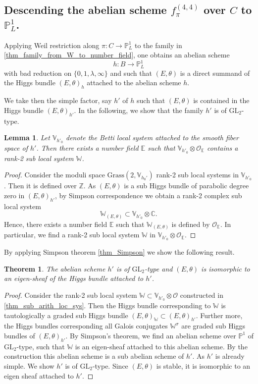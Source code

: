 \documentclass[12pt,twoside]{book}
\theoremstyle{plain}
\newtheorem{theorem}{Theorem}[section]
\newtheorem{lemma}[lemma]{Lemma}
\theoremstyle{definition}
\theoremstyle{remark}
\newcommand{\mO}{{\mathcal O}}
\numberwithin{equation}{section}
\def\EK{{\mathbb E}}
\begin{document}
\subsection{Descending the abelian scheme $f^{(4,4)}_{\pi}$ over $C$ to $\mathbb P^1_L$.}

Applying Weil restriction along $\pi\colon C\rightarrow \mathbb P^1_L$ to the family in \autoref{thm_family_from_W_to_number_field}, one obtains an abelian scheme
\[h\colon B\to \mathbb P^1_L\]
with bad reduction on $\{0,1,\lambda,\infty\}$ and such that $(E,\theta)$ is a direct summand of the Higgs bundle $(E,\theta)_{h}$ attached to the abelian scheme $h$.

We take then the simple factor, say $h'$ of $h$ such that $(E,\theta )$ is contained in the Higgs bundle $(E,\theta)_{h'}$.
In the following, we show that the family $h'$ is of $\text{GL}_2$-type.

\begin{lemma} \label{thm_sub_arith_loc_sys} Let $\mathbb V_{h'_0}$ denote the Betti local system attached to the smooth fiber space of $h'$. Then there exists a number field $\EK$ such that $\mathbb V_{h'_0}\otimes \mO_\EK$ contains a rank-2 sub local system $\mathbb W$.
\end{lemma}
\begin{proof}
Consider the moduli space $\text{Grass}( 2,\mathbb V_{h_0'})$ rank-2 sub local systems in $\mathbb V_{h'_0}$. Then it is defined over $\mathbb Z$. As $(E,\theta)$ is a sub Higgs bundle of parabolic degree zero in
$(E,\theta)_{h'}$, by Simpson correspondence we obtain a rank-2 complex sub local system
\[\mathbb W_{(E,\theta)}\subset \mathbb V_{h'_0}\otimes \mathbb C.\]
Hence, there exists a number field $\EK$ such that $\mathbb W_{(E,\theta)}$ is defined by $\mO_{\EK}$. In particular, we find a rank-2 sub local system $\mathbb W$ in $\mathbb V_{h'_0}\otimes \mO_{\EK}$.
\end{proof}

By applying Simpson theorem \autoref{thm_Simpson} we show the following result.
\begin{theorem} \label{thm_family_GL2_component}
The abelian scheme $h'$ is of $\text{GL}_2$-type and $(E,\theta)$ is isomorphic to an eigen-sheaf of the Higgs bundle attached to $h'$.
\end{theorem}
\begin{proof}
Consider the rank-2 sub local system $\mathbb W\subset \mathbb V_{h'_0}\otimes \mathcal O$ constructed in \autoref{thm_sub_arith_loc_sys}. Then the Higgs bundle corresponding to $\mathbb W$ is tautologically a graded sub Higgs bundle $(E,\theta)_{\mathbb W}\subset(E,\theta)_{h'}$. Further more, the Higgs bundles corresponding all Galois conjugates $\mathbb W^\sigma$ are graded sub Higgs bundles of $(E,\theta)_{h'}$. By Simpson's theorem, we find an abelian scheme over $\mathbb P^1$ of $\text{GL}_2$-type, such that $\mathbb W$ is an eigen-sheaf attached to this abelian scheme. By the construction this abelian scheme is a sub abelian scheme of $h'$. As $h'$ is already simple. We show $h'$ is of $\text{GL}_2$-type. Since $(E,\theta)$ is stable, it is isomorphic to an eigen sheaf attached to $h'$.
\end{proof}
\end{document}
